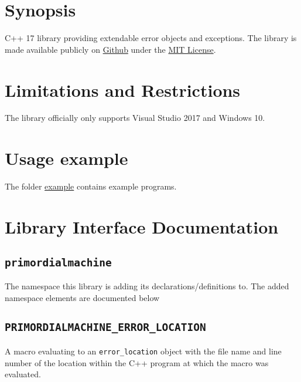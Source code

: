 \documentclass[oneside]{book}
\begin{document}
\lstset{language=C++,
  basicstyle=\footnotesize, %
  showstringspaces=false    %
}

\frontmatter

\begin{titlepage}
\maketitle
\end{titlepage}

\tableofcontents
{}

\mainmatter

\chapter{Synopsis}
C++ 17 library providing extendable error objects and exceptions.
The library is made available publicly on
\href{\GetLibraryRepository}{Github}
under the
\href{\GetLibraryRepository/blob/master/LICENSE}{MIT License}.

\chapter{Limitations and Restrictions}
The library officially only supports Visual Studio 2017 and Windows 10.

\chapter{Usage example}
The folder \href{\GetLibraryRepository/blob/master/example}{example} contains example programs.



\chapter{Library Interface Documentation}

\section{\texttt{primordialmachine}}
The namespace this library is adding its declarations/definitions to.
The added namespace elements are documented below

\section{\texttt{PRIMORDIALMACHINE\_ERROR\_LOCATION}}
A macro evaluating to an \texttt{error\_location} object with the file name and line number of the
location within the C++ program at which the macro was evaluated.
\end{document}
